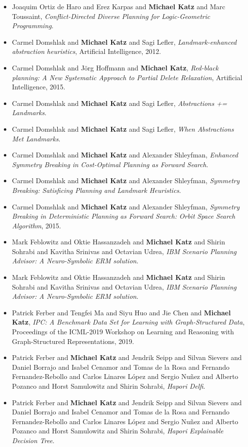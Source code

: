 \begin{itemize}[noitemsep]
\item Joaquim Ortiz de Haro and Erez Karpas and {\bf Michael Katz} and Marc Toussaint, {\it Conflict-Directed Diverse Planning for Logic-Geometric Programming}.
\item Carmel Domshlak and {\bf Michael Katz} and Sagi Lefler, {\it Landmark-enhanced abstraction heuristics}, Artificial Intelligence, 2012.
\item Carmel Domshlak and Jörg Hoffmann and {\bf Michael Katz}, {\it Red-black planning: A New Systematic Approach to Partial Delete Relaxation}, Artificial Intelligence, 2015.
\item Carmel Domshlak and {\bf Michael Katz} and Sagi Lefler, {\it Abstractions += Landmarks}.
\item Carmel Domshlak and {\bf Michael Katz} and Sagi Lefler, {\it When Abstractions Met Landmarks}.
\item Carmel Domshlak and {\bf Michael Katz} and Alexander Shleyfman, {\it Enhanced Symmetry Breaking in Cost-Optimal Planning as Forward Search}.
\item Carmel Domshlak and {\bf Michael Katz} and Alexander Shleyfman, {\it Symmetry Breaking: Satisficing Planning and Landmark Heuristics}.
\item Carmel Domshlak and {\bf Michael Katz} and Alexander Shleyfman, {\it Symmetry Breaking in Deterministic Planning as Forward Search: Orbit Space Search Algorithm}, 2015.
\item Mark Feblowitz and Oktie Hassanzadeh and {\bf Michael Katz} and Shirin Sohrabi and Kavitha Srinivas and Octavian Udrea, {\it IBM Scenario Planning Advisor: A Neuro-Symbolic ERM solution}.
\item Mark Feblowitz and Oktie Hassanzadeh and {\bf Michael Katz} and Shirin Sohrabi and Kavitha Srinivas and Octavian Udrea, {\it IBM Scenario Planning Advisor: A Neuro-Symbolic ERM solution}.
\item Patrick Ferber and Tengfei Ma and Siyu Huo and Jie Chen and {\bf Michael Katz}, {\it IPC: A Benchmark Data Set for Learning with Graph-Structured Data}, Proceedings of the ICML-2019 Workshop on Learning and Reasoning with Graph-Structured Representations, 2019.
\item Patrick Ferber and {\bf Michael Katz} and Jendrik Seipp and Silvan Sievers and Daniel Borrajo and Isabel Cenamor and Tomas de la Rosa and Fernando Fernandez-Rebollo and Carlos Linares López and Sergio Nuñez and Alberto Pozanco and Horst Samulowitz and Shirin Sohrabi, {\it Hapori Delfi}.
\item Patrick Ferber and {\bf Michael Katz} and Jendrik Seipp and Silvan Sievers and Daniel Borrajo and Isabel Cenamor and Tomas de la Rosa and Fernando Fernandez-Rebollo and Carlos Linares López and Sergio Nuñez and Alberto Pozanco and Horst Samulowitz and Shirin Sohrabi, {\it Hapori Explainable Decision Tree}.

\end{itemize}
